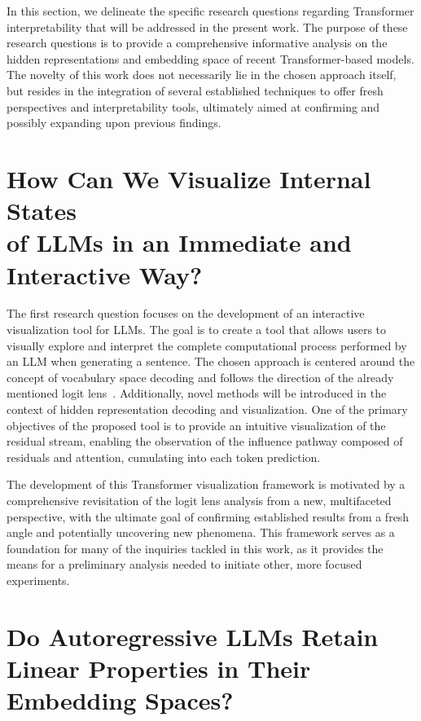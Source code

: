 In this section, we delineate the specific research questions regarding Transformer interpretability that will be addressed in the present work.
The purpose of these research questions is to provide a comprehensive informative analysis on the hidden representations and embedding space of recent Transformer-based models.
The novelty of this work does not necessarily lie in the chosen approach itself, but resides in the integration of several established techniques to offer fresh perspectives and interpretability tools, ultimately aimed at confirming and possibly expanding upon previous findings.

\section{How Can We Visualize Internal States \texorpdfstring{ \\ }{} of LLMs in an Immediate and \texorpdfstring{ \\ }{} Interactive Way?}\label{sec:rq_intravisto}

The first research question focuses on the development of an interactive visualization tool for LLMs.
The goal is to create a tool that allows users to visually explore and interpret the complete computational process performed by an LLM when generating a sentence.
The chosen approach is centered around the concept of vocabulary space decoding and follows the direction of the already mentioned logit lens~\cite{nostalgebraist2020}.
Additionally, novel methods will be introduced in the context of hidden representation decoding and visualization.
One of the primary objectives of the proposed tool is to provide an intuitive visualization of the residual stream, enabling the observation of the influence pathway composed of residuals and attention, cumulating into each token prediction.

The development of this Transformer visualization framework is motivated by a comprehensive revisitation of the logit lens analysis from a new, multifaceted perspective, with the ultimate goal of confirming established results from a fresh angle and potentially uncovering new phenomena.
This framework serves as a foundation for many of the inquiries tackled in this work, as it provides the means for a preliminary analysis needed to initiate other, more focused experiments.

\section{Do Autoregressive LLMs Retain Linear Properties in Their Embedding Spaces?}\label{sec:rq_embeddings}


